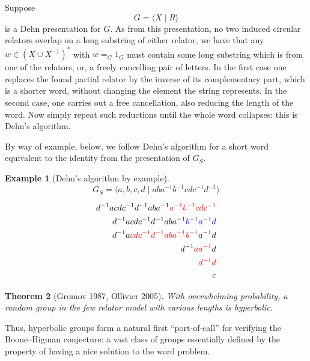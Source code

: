 \documentclass[usenames,dvipsnames]{amsart}
\newtheorem{theorem}{Theorem}[section]
\theoremstyle{definition}
\newtheorem{example}[theorem]{Example}
\begin{document}
 

 Suppose \[G=\langle X\mid R\rangle\] is a Dehn presentation for $G$.  As from this presentation, no two induced circular relators overlap on a long substring of either relator, we have that any  $w\in (X\cup X^{-1})^*$  with $w =_G 1_G$ must contain some long substring which is from one of the relators, or, a freely cancelling pair of letters. In the first case one replaces the found partial relator by the inverse of its complementary part, which is a shorter word, without changing the element the string represents.  In the second case, one carries out a free cancellation, also reducing the length of the word.  Now simply repeat such reductions until the whole word collapses: this is Dehn's algorithm.%
 
By way of example, below, we follow Dehn's algorithm for a short word equivalent to the identity from the presentation of $G_S$. 
  \begin{example}
  [Dehn's algorithm by example]
      \[G_S=\langle a,b,c,d\mid aba^{-1}b^{-1}cdc^{-1}d^{-1}\rangle\]%

\vspace {-.2 in}
      \begin{align*}
      d^{-1}acdc^{-1}d^{-1}aba^{-1}{\color{red}{a^{-1}b^{-1}cdc^{-1}}}\\
      d^{-1}acdc^{-1}d^{-1}aba^{-1}{\color{blue}{b^{-1}a^{-1}d}}\\
      d^{-1}a{\color{red}cdc^{-1}d^{-1}aba^{-1}b^{-1}} a^{-1}d\\
      d^{-1}{\color{red}a a^{-1}}d\\
    {\color{red}d^{-1} d}\\
       \varepsilon\\
      \end{align*}
\end{example}
  \begin{theorem}[Gromov 1987, Ollivier 2005]
With overwhelming probability, a random group in the few relator model with various lengths is hyperbolic.\end{theorem}%
     
Thus, hyperbolic groups form a natural first ``port-of-call'' for verifying the Boone--Higman conjecture: a vast class of groups essentially defined by the property of having a nice solution to the word problem.
     
\end{document}
